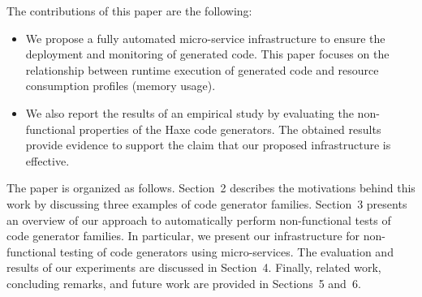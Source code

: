 The contributions of this paper are the following:
\begin{itemize} 	
		\setlength\itemsep{0em}
			
	\item We propose a fully automated micro-service infrastructure to ensure the deployment and monitoring of generated code. This paper focuses on the relationship between runtime execution of generated code and resource consumption profiles (memory usage).
	\item We also report the results of an empirical study by evaluating the non-functional properties of the Haxe code generators. 
	The obtained results provide evidence to support the claim that our proposed infrastructure is effective.	
\end{itemize}

The paper is organized as follows.
Section~2 describes the motivations behind this work by discussing three examples of code generator families. 
Section~3 presents an overview of our approach to automatically perform non-functional tests of code generator families. In particular, we present our infrastructure for non-functional testing of code generators using micro-services. 
The evaluation and results of our experiments are discussed in Section~4. 
Finally, related work, concluding remarks, and future work are provided in Sections~5 and~6.

